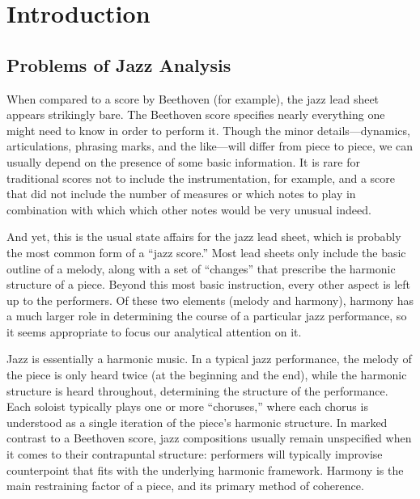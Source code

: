 \documentclass[diss]{subfiles}
\begin{document}
\chapter{Introduction}

\section{Problems of Jazz Analysis}
\label{sec:problems-jazz-analysis} %

When compared to a score by Beethoven (for example), the jazz lead sheet
appears strikingly bare. The Beethoven score specifies nearly everything one
might need to know in order to perform it. Though the minor details---dynamics,
articulations, phrasing marks, and the like---will differ from piece to piece,
we can usually depend on the presence of some basic information. It is rare
for traditional scores not to include the instrumentation, for example, and a
score that did not include the number of measures or which notes to play in
combination with which which other notes would be very unusual indeed.

And yet, this is the usual state affairs for the jazz lead sheet, which is
probably the most common form of a “jazz score.” Most lead sheets
only include the basic outline of a melody, along with a set of “changes” that
prescribe the harmonic structure of a piece. Beyond this most basic
instruction, every other aspect is left up to the performers.  Of these two
elements (melody and harmony), harmony has a much larger role in determining
the course of a particular jazz performance, so it seems appropriate to focus
our analytical attention on it.

Jazz is essentially a harmonic music. In a typical jazz performance, the melody
of the piece is only heard twice (at the beginning and the end), while the
harmonic structure is heard throughout, determining the structure of the
performance. Each soloist typically plays one or more “choruses,” where each
chorus is understood as a single iteration of the piece’s harmonic structure.
In marked contrast to a Beethoven score, jazz compositions usually remain
unspecified when it comes to their contrapuntal structure: performers will
typically improvise counterpoint that fits with the underlying harmonic
framework. Harmony is the main restraining factor of a piece, and its primary
method of coherence.
\end{document}
